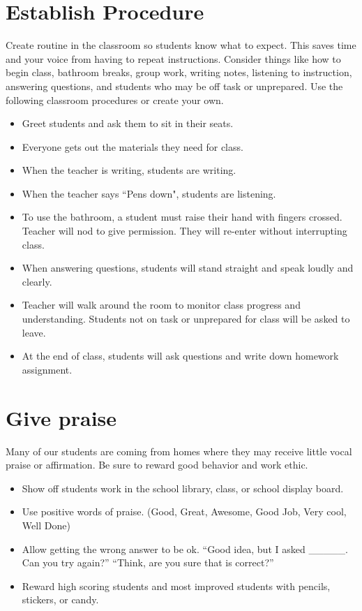 \section{Establish Procedure}

Create routine in the classroom so students know what to expect.  This saves time and your voice from having to repeat instructions.   Consider things like how to begin class, bathroom breaks, group work, writing notes, listening to instruction, answering questions, and students who may be off task or unprepared. Use the following classroom procedures or create your own. 

\begin{itemize}
 \item Greet students and ask them to sit in their seats.
 \item Everyone gets out the materials they need for class.
 \item When the teacher is writing, students are writing.
 \item When the teacher says ``Pens down", students are listening.
 \item To use the bathroom, a student must raise their hand with fingers crossed.  Teacher will nod to give permission.  They will re-enter without interrupting class.
 \item When answering questions, students will stand straight and speak loudly and clearly.
 \item Teacher will walk around the room to monitor class progress and understanding.  Students not on task or unprepared for class will be asked to leave.
 \item At the end of class, students will ask questions and write down homework assignment.
\end{itemize}

\section{Give praise}
Many of our students are coming from homes where they may receive little vocal praise or affirmation.  Be sure to reward good behavior and work ethic.

\begin{itemize}
 \item Show off students work in the school library, class, or school display board.
 \item Use positive words of praise.  (Good, Great, Awesome, Good Job, Very cool, Well Done)
 \item Allow getting the wrong answer to be ok. ``Good idea, but I asked \_\_\_\_\_. Can you try again?'' ``Think, are you sure that is correct?''  
 \item Reward high scoring students and most improved students with pencils, stickers, or candy.
\end{itemize}

